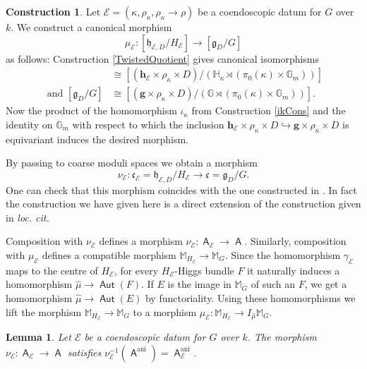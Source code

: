 \documentclass{article}
\DeclareMathOperator{\A}{\mathsf{A}}
\DeclareMathOperator{\ani}{ani}
\DeclareMathOperator{\Aut}{\mathsf{Aut}}
\newcommand{\BG}{{\mathbb{G}}}
\newcommand{\BH}{{\mathbb{H}}}
\newcommand{\BM}{{\mathbb{M}}}
\newcommand{\CE}{{\mathcal E}}
\let\into\hookrightarrow
\theoremstyle{definition}
\newtheorem{construction}[definition]{Construction}
\theoremstyle{plain}
\newtheorem{lemma}[definition]{Lemma}
\begin{document}
\begin{construction} \label{muCons}
  Let $\CE=(\kappa,\rho_\kappa,\rho_\kappa \to \rho)$ be a coendoscopic datum for $G$ over $k$. We construct a canonical morphism 
  \begin{equation*}
    \mu_\CE \colon [\mathfrak{h}_{\CE,D}/H_\CE] \to [\mathfrak{g}_D/G]
  \end{equation*}
as follows: Construction \ref{TwistedQuotient} gives canonical isomorphisms
\begin{align*}
  [\mathfrak{h}_{\CE,D}/H_\CE] & \cong [(\mathbf{h}_\CE \times \rho_\kappa \times D) / (\BH_\kappa \rtimes (\pi_0(\kappa) \times \BG_m))] \\
\text{ and }  [\mathfrak{g}_D /G] & \cong [(\mathbf{g} \times \rho_\kappa \times D) / (\BG \rtimes (\pi_0(\kappa) \times \BG_m))].
\end{align*}
Now the product of the homomorphism $\iota_\kappa$ from Construction \ref{ikCons} and the identity on $\BG_m$ with respect to which the inclusion $\mathbf{h}_\CE \times \rho_\kappa \times D \into \mathbf{g} \times \rho_\kappa \times D$ is equivariant induces the desired morphism.

By passing to coarse moduli spaces we obtain a morphism 
\begin{equation*}
  \nu_\CE \colon \mathfrak{c}_\CE=\mathfrak{h}_{\CE,D}/H_\CE \to \mathfrak{c}=\mathfrak{g}_D/G.
\end{equation*}
One can check that this morphism coincides with the one constructed in \cite[1.9]{MR2653248}. In fact the construction we have given here is a direct extension of the construction given in \emph{loc. cit.}

Composition with $\nu_\CE$ defines a morphism $\nu_\CE\colon \A_{\CE} \to \A$. Similarly, composition with $\mu_\CE$ defines a compatible morphism $\BM_{H_\CE} \to \BM_G$. Since the homomorphism $\gamma_\CE$ maps to the centre of $H_\CE$, for every $H_\CE$-Higgs bundle $F$ it naturally induces a homomorphism $\hat \mu \to \Aut(F)$. If $E$ is the image in $\BM_G$ of such an $F$, we get a homomorphism $\hat\mu \to \Aut(E)$ by functoriality. Using these homomorphisms we lift the morphism $\BM_{H_\CE} \to \BM_G$ to a morphism $\mu_\CE\colon \BM_{H_\CE} \to I_{\hat\mu} \BM_G$.

\end{construction}
\begin{lemma}\label{AniComp}
  Let $\CE$ be a coendoscopic datum for $G$ over $k$. The morphism $\nu_\CE \colon \A_\CE \to \A$ satisfies $\nu_\CE^{-1}(\A^{\ani})=\A_\CE^{\ani}$.

\end{lemma}
\end{document}
